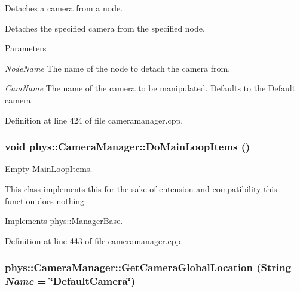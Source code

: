 Detaches a camera from a node. 

Detaches the specified camera from the specified node. 
\begin{DoxyParams}{Parameters}
\item[{\em NodeName}]The name of the node to detach the camera from. \item[{\em CamName}]The name of the camera to be manipulated. Defaults to the Default camera. \end{DoxyParams}


Definition at line 424 of file cameramanager.cpp.

\hypertarget{classphys_1_1CameraManager_aaae22266bccc43f6efa66d2735d7d1d3}{
\subsubsection[{DoMainLoopItems}]{\setlength{\rightskip}{0pt plus 5cm}void phys::CameraManager::DoMainLoopItems ()}}
\label{d9/d91/classphys_1_1CameraManager_aaae22266bccc43f6efa66d2735d7d1d3}


Empty MainLoopItems. 

\hyperlink{structThis}{This} class implements this for the sake of entension and compatibility this function does nothing 

Implements \hyperlink{classphys_1_1ManagerBase_aa9e13a3f7c398b708f0f242610b5abf7}{phys::ManagerBase}.



Definition at line 443 of file cameramanager.cpp.

\hypertarget{classphys_1_1CameraManager_a53ef7e8f0a4227a5a35db88fe74772fa}{
\subsubsection[{GetCameraGlobalLocation}]{ phys::CameraManager::GetCameraGlobalLocation ({\bf String} {\em Name} = {\ttfamily \char`\"{}DefaultCamera\char`\"{}})}}
\label{d9/d91/classphys_1_1CameraManager_a53ef7e8f0a4227a5a35db88fe74772fa}


